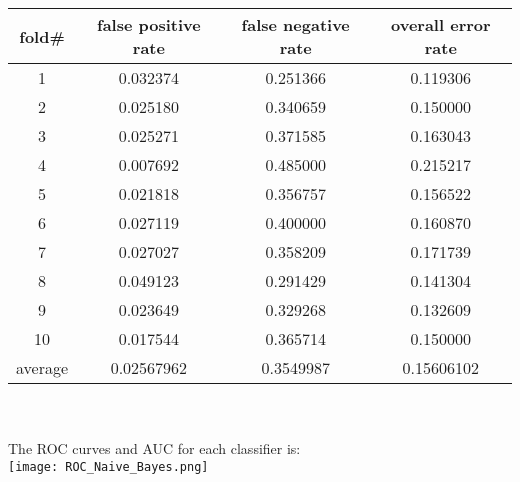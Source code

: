 \documentclass[11pt,a4paper,fleqn]{article}
\begin{document}
\begin{tabular}{|c|c|c|c|}
\hline
fold\#&false positive rate&false negative rate&overall error rate\\
\hline
1&0.032374&0.251366&0.119306\\
\hline
2&0.025180&0.340659&0.150000\\
\hline
3&0.025271&0.371585&0.163043\\
\hline
4&0.007692&0.485000&0.215217\\
\hline
5&0.021818&0.356757&0.156522\\
\hline
6&0.027119&0.400000&0.160870\\
\hline
7&0.027027&0.358209&0.171739\\
\hline
8&0.049123&0.291429&0.141304\\
\hline
9&0.023649&0.329268&0.132609\\
\hline
10&0.017544&0.365714&0.150000\\
\hline
average&0.02567962&0.3549987&0.15606102\\
\hline
\end{tabular}\\
\\
The ROC curves and AUC for each classifier is:\\
\texttt{[image: ROC\_Naive\_Bayes.png]}\\
 
\end{document}
